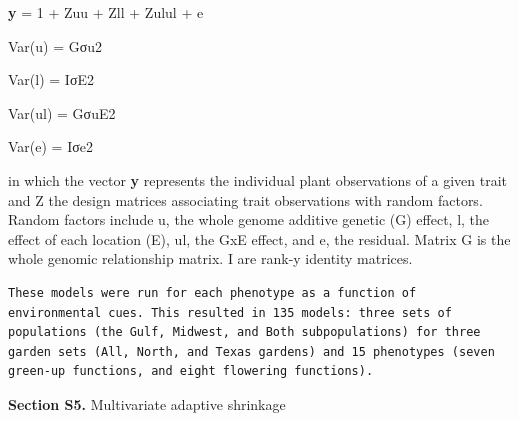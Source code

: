 \documentclass[
  letterpaper,
  DIV=11,
  numbers=noendperiod]{scrartcl}
\begin{document}
\textbf{y} = 1 + Zuu + Zll + Zulul + e

Var(u) = Gσu2

Var(l) = IσE2

Var(ul) = GσuE2

Var(e) = Iσe2

in which the vector \textbf{y} represents the individual plant
observations of a given trait and Z the design matrices associating
trait observations with random factors. Random factors include u, the
whole genome additive genetic (G) effect, l, the effect of each location
(E), ul, the GxE effect, and e, the residual. Matrix G is the whole
genomic relationship matrix. I are rank-y identity matrices.~

\begin{verbatim}
These models were run for each phenotype as a function of environmental cues. This resulted in 135 models: three sets of populations (the Gulf, Midwest, and Both subpopulations) for three garden sets (All, North, and Texas gardens) and 15 phenotypes (seven green-up functions, and eight flowering functions).
\end{verbatim}

\hfill\break

\textbf{Section S5.} Multivariate adaptive shrinkage
\end{document}
